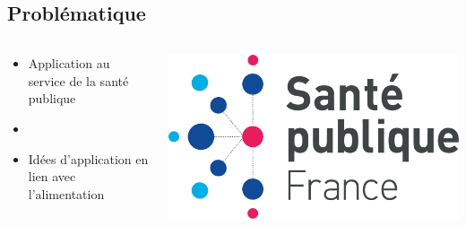 \subsection{Problématique}
\begin{frame}{\insertsubsection}
  \begin{columns}
    \begin{column}{.6\textwidth}
      \begin{itemize}
        \item Application au service de la santé publique
        \item[]
        \item Idées d'application en lien avec l'alimentation
      \end{itemize}
    \end{column}
    \begin{column}{.4\textwidth}
      \includegraphics[width=.8\textwidth]{./Sante-publique-France-logo.pdf}
    \end{column}
  \end{columns}
\end{frame}


